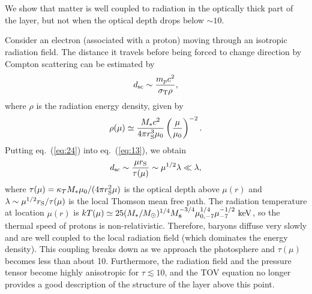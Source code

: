 \documentclass[useAMS,usenatbib]{mn2e}
\begin{document}
\appendix
\section{}

We show that matter is well coupled to radiation in the optically
thick part of the layer, but not when the optical depth drops below
$\sim10$.

Consider an electron (associated with a proton) moving through an
isotropic radiation field. The distance it travels before being forced
to change direction by Compton scattering can be estimated
by
\begin{equation}
  \label{eq:13}
  d_{\rm sc}\sim \frac{m_pc^2}{\sigma_{\rm T} \rho},
\end{equation}
where $\rho$ is the radiation energy density, given by
\begin{equation}
  \label{eq:24}
  \rho(\mu)\simeq \frac{M_*c^2}{4\pi r_{\rm S}^3\mu_0}
  \left(\frac{\mu}{\mu_0}\right)^{-2}.
\end{equation}
Putting eq.~(\ref{eq:24}) into eq.~(\ref{eq:13}), we obtain
\begin{equation}
  \label{eq:26}
  d_{\rm sc}\sim \frac{\mu r_{\rm S}}{\tau(\mu)}\sim
  \mu^{1/2}\lambda \ll \lambda, 
\end{equation}
where $\tau(\mu) = \kappa_T M_* \mu_0/(4\pi r_{\rm S}^2\mu)$ is the
optical depth above $\mu(r)$ and $\lambda\sim \mu^{1/2}r_{\rm
  S}/\tau(\mu)$ is the local Thomson mean free path. The radiation
temperature at location $\mu(r)$ is $kT(\mu)\simeq 25 
(M_*/M_{\rm \odot})^{1/4} M_8^{-3/4} \mu_{0,-7}^{1/4}\mu_{-7}^{-1/2}\rm\
keV$, so the thermal speed of protons is non-relativistic. Therefore,
baryons diffuse very slowly and are well coupled to the local
radiation field (which dominates the energy density). This coupling
breaks down as we approach the photosphere and
$\tau(\mu)$ becomes less than about 10. Furthermore, the radiation field
and the pressure tensor become highly anisotropic for $\tau \lesssim
10$, and the TOV equation no longer provides a good description of the
structure of the layer above this point.

\label{lastpage}
\end{document}

